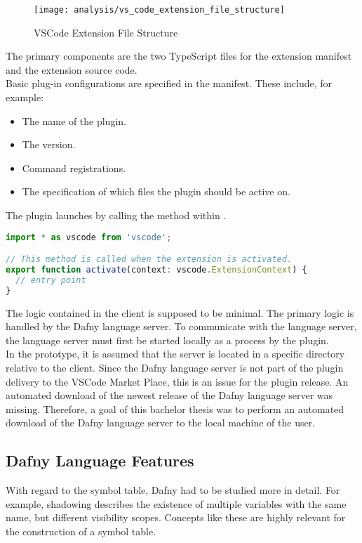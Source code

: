 \begin{figure}[H]
    \centering
    \texttt{[image: analysis/vs\_code\_extension\_file\_structure]}
    \caption{VSCode Extension File Structure}
    \label{fig:vs_code_extension_file_structure}
\end{figure}

The primary components are the two TypeScript files for the extension manifest and the extension source code. \\

Basic plug-in configurations are specified in the manifest.
These include, for example:
\begin{itemize}
    \item The name of the plugin.
    \item The version.
    \item Command registrations.
    \item The specification of which files the plugin should be active on.
\end{itemize}

The plugin launches by calling the method  within .

\begin{lstlisting}[language=typescript, caption={extension.ts}, captionpos=b, label={lst:extension-file}]
import * as vscode from 'vscode';

// This method is called when the extension is activated.
export function activate(context: vscode.ExtensionContext) {
  // entry point
}
\end{lstlisting}

The logic contained in the client is supposed to be minimal.
The primary logic is handled by the Dafny language server.
To communicate with the language server, the language server must first be started locally as a process by the plugin. \\

In the prototype, it is assumed that the server is located in a specific directory relative to the client.
Since the Dafny language server is not part of the plugin delivery to the VSCode Market Place,
this is an issue for the plugin release.
An automated download of the newest release of the Dafny language server was missing.
Therefore, a goal of this bachelor thesis was to perform an automated download of the Dafny language server to the local machine of the user.

\subsection{Dafny Language Features}
With regard to the symbol table, Dafny had to be studied more in detail.
For example, shadowing describes the existence of multiple variables with the same name, but different visibility scopes.
Concepts like these are highly relevant for the construction of a symbol table. \\

